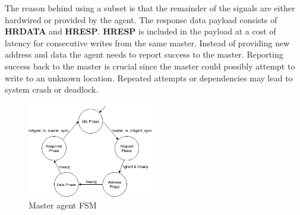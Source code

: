 The reason behind using a subset is that the remainder of the signals are either hardwired or provided by the agent. The response data payload consists of \textbf{HRDATA} and \textbf{HRESP}. \textbf{HRESP} is included in the payload at a cost of latency for consecutive writes from the same master. Instead of providing new address and data the agent needs to report success to the master. Reporting success back to the master is crucial since the master could possibly attempt to write to an unknown location. Repeated attempts or dependencies may lead to system crash or deadlock. 
\newline
\begin{figure}
\includegraphics[width=5.5cm]{figs/hw/mAgent_FSM.png}
\caption{Master agent FSM}\label{fig:rafsm}
\end{figure}  

